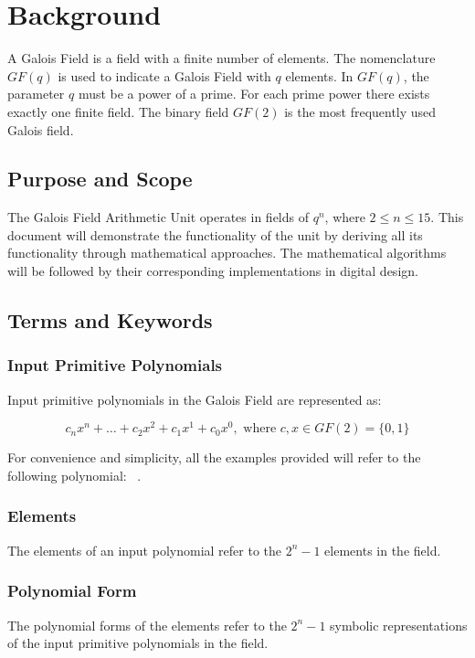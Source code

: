 \section{Background} A Galois Field is a field with a finite number of
elements. The nomenclature $GF(q)$ is used to indicate a Galois Field with $q$
elements. In $GF(q)$, the parameter $q$ must be a power of a prime. For each
prime power there exists exactly one finite field. The binary field $GF(2)$ is
the most frequently used Galois field. \cite{finitefield}

    \subsection{Purpose and Scope} The Galois Field Arithmetic Unit
    operates in fields of $q^n$, where $2 \leq n \leq 15$. This document
    will demonstrate the functionality of the unit by deriving all its
    functionality through mathematical approaches. The mathematical
    algorithms will be followed by their corresponding implementations in
    digital design.

    \subsection{Terms and Keywords}

        \subsubsection{Input Primitive Polynomials} Input primitive
        polynomials in the Galois Field are represented as:

        \[ c_{n}x^{n}+\ldots+c_{2}x^{2}+c_{1}x^{1}+c_{0}x^{0}, \text{ where }
        c,x \in GF(2)=\{0,1\} \]

        For convenience and simplicity, all the examples provided will
        refer to the following polynomial: \examplepoly~.

        \subsubsection{Elements} The elements of an input polynomial refer
        to the $2^{n}-1$ elements in the field.

        \subsubsection{Polynomial Form} The polynomial forms of the
        elements refer to the $2^{n}-1$ symbolic representations of the input
        primitive polynomials in the field.

